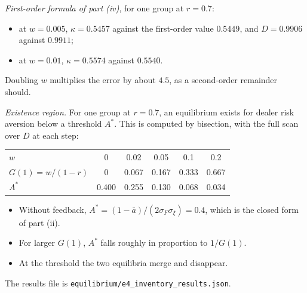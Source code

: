 \documentclass[12pt]{article}
\theoremstyle{definition}
\theoremstyle{remark}
\begin{document}
\emph{First-order formula of part (iv)}, for one group at $r=0.7$:
\begin{itemize}[itemsep=1pt,topsep=2pt]
\item at $w=0.005$, $\kappa=0.5457$ against the first-order value $0.5449$, and $D=0.9906$ against $0.9911$;
\item at $w=0.01$, $\kappa=0.5574$ against $0.5540$.
\end{itemize}
Doubling $w$ multiplies the error by about $4.5$, as a second-order remainder should.

\emph{Existence region.} For one group at $r=0.7$, an equilibrium exists for dealer risk aversion below a threshold $A^*$. This is computed by bisection, with the full scan over $D$ at each step:
\begin{center}\small
\begin{tabular}{lccccc}
\hline
$w$ & 0 & 0.02 & 0.05 & 0.1 & 0.2\\
$G(1)=w/(1-r)$ & 0 & 0.067 & 0.167 & 0.333 & 0.667\\
$A^*$ & 0.400 & 0.255 & 0.130 & 0.068 & 0.034\\
\hline
\end{tabular}
\end{center}
\begin{itemize}[itemsep=1pt,topsep=2pt]
\item Without feedback, $A^*=(1-\bar a)/(2\sigma_F\sigma_\xi)=0.4$, which is the closed form of part (ii).
\item For larger $G(1)$, $A^*$ falls roughly in proportion to $1/G(1)$.
\item At the threshold the two equilibria merge and disappear.
\end{itemize}
The results file is \nolinkurl{equilibrium/e4_inventory_results.json}.
\end{document}
